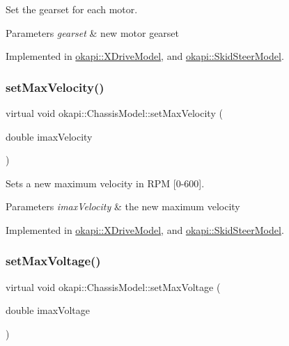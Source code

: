 Set the gearset for each motor.


\begin{DoxyParams}{Parameters}
{\em gearset} & new motor gearset \\
\hline
\end{DoxyParams}


Implemented in \mbox{\hyperlink{classokapi_1_1XDriveModel_ae9205c16e581786fecabaeb5066edab6}{okapi\+::\+X\+Drive\+Model}}, and \mbox{\hyperlink{classokapi_1_1SkidSteerModel_ad890989e345cfd7455436bc5dd6efdcc}{okapi\+::\+Skid\+Steer\+Model}}.

\mbox{\label{classokapi_1_1ChassisModel_ae7fcb4cc95fdd7fd3c8f8388b4a698b2}} 
\subsubsection{\texorpdfstring{setMaxVelocity()}{setMaxVelocity()}}
{\footnotesize\ttfamily virtual void okapi\+::\+Chassis\+Model\+::set\+Max\+Velocity (\begin{DoxyParamCaption}\item[{double}]{imax\+Velocity }\end{DoxyParamCaption})\hspace{0.3cm}{\ttfamily [pure virtual]}}

Sets a new maximum velocity in R\+PM \mbox{[}0-\/600\mbox{]}.


\begin{DoxyParams}{Parameters}
{\em imax\+Velocity} & the new maximum velocity \\
\hline
\end{DoxyParams}


Implemented in \mbox{\hyperlink{classokapi_1_1XDriveModel_aec91f0569213bbca770ad4a25529beb6}{okapi\+::\+X\+Drive\+Model}}, and \mbox{\hyperlink{classokapi_1_1SkidSteerModel_a4beda353f201fa72fc8d31f47a08d473}{okapi\+::\+Skid\+Steer\+Model}}.

\mbox{\label{classokapi_1_1ChassisModel_a2fb261636b79e118f22530cc3fce4f41}} 
\subsubsection{\texorpdfstring{setMaxVoltage()}{setMaxVoltage()}}
{\footnotesize\ttfamily virtual void okapi\+::\+Chassis\+Model\+::set\+Max\+Voltage (\begin{DoxyParamCaption}\item[{double}]{imax\+Voltage }\end{DoxyParamCaption})\hspace{0.3cm}{\ttfamily [pure virtual]}}

